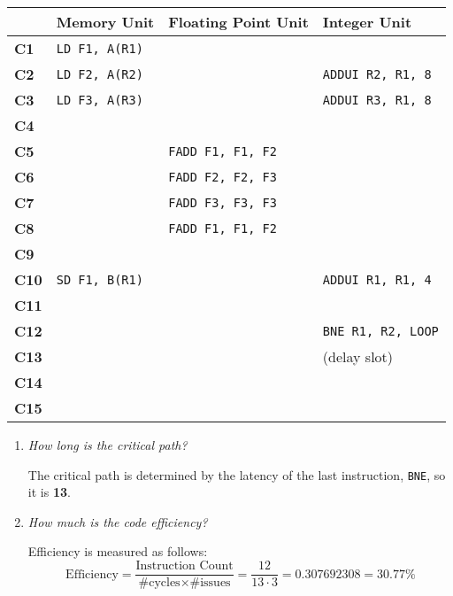 \begin{table}[!htp]
    \centering
    \begin{tabular}{@{} l | l | l | l @{}}
        \toprule
        & \textbf{Memory Unit} & \textbf{Floating Point Unit} & \textbf{Integer Unit} \\
        \midrule
        \textbf{C1}  & \texttt{LD F1, A(R1)} & & \\ [.3em]
        \textbf{C2}  & \texttt{LD F2, A(R2)} & & \texttt{ADDUI R2, R1, 8} \\ [.3em]
        \textbf{C3}  & \texttt{LD F3, A(R3)} & & \texttt{ADDUI R3, R1, 8} \\ [.3em]
        \textbf{C4}  & & & \\ [.3em]
        \textbf{C5}  & & \texttt{FADD F1, F1, F2} & \\ [.3em]
        \textbf{C6}  & & \texttt{FADD F2, F2, F3} & \\ [.3em]
        \textbf{C7}  & & \texttt{FADD F3, F3, F3} & \\ [.3em]
        \textbf{C8}  & & \texttt{FADD F1, F1, F2} & \\ [.3em]
        \textbf{C9}  & & & \\ [.3em]
        \textbf{C10}  & \texttt{SD F1, B(R1)} & & \texttt{ADDUI R1, R1, 4} \\ [.3em]
        \textbf{C11}  & & & \\ [.3em]
        \textbf{C12}  & & & \texttt{BNE R1, R2, LOOP} \\ [.3em]
        \textbf{C13}  & & & (delay slot) \\ [.3em]
        \textbf{C14}  & & & \\ [.3em]
        \textbf{C15}  & & & \\
        \bottomrule
    \end{tabular}
\end{table}

\begin{enumerate}
    \item \emph{How long is the critical path?}

    \answer The critical path is determined by the latency of the last instruction, \texttt{BNE}, so it is \textbf{13}.


    \item \emph{How much is the code efficiency?}

    \answer Efficiency is measured as follows:
    \begin{equation*}
        \text{Efficiency} = \dfrac{\text{Instruction Count}}{\text{\# cycles} \times \text{\# issues}} = \dfrac{12}{13 \cdot 3} = 0.307692308 = 30.77 \%
    \end{equation*}
\end{enumerate}

